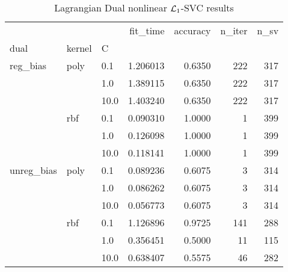 \begin{table}[H]
\centering
\caption{Lagrangian Dual nonlinear $\protect \mathcal{L}_1$-SVC results}
\label{nonlinear_lagrangian_dual_l1_svc_cv_results}
\begin{tabular}{lllrrrr}
\toprule
           &     &      &  fit\_time &  accuracy &  n\_iter &  n\_sv \\
dual & kernel & C &           &           &         &       \\
\midrule
reg\_bias & poly & 0.1  &  1.206013 &    0.6350 &     222 &   317 \\
           &     & 1.0  &  1.389115 &    0.6350 &     222 &   317 \\
           &     & 10.0 &  1.403240 &    0.6350 &     222 &   317 \\
           & rbf & 0.1  &  0.090310 &    1.0000 &       1 &   399 \\
           &     & 1.0  &  0.126098 &    1.0000 &       1 &   399 \\
           &     & 10.0 &  0.118141 &    1.0000 &       1 &   399 \\
unreg\_bias & poly & 0.1  &  0.089236 &    0.6075 &       3 &   314 \\
           &     & 1.0  &  0.086262 &    0.6075 &       3 &   314 \\
           &     & 10.0 &  0.056773 &    0.6075 &       3 &   314 \\
           & rbf & 0.1  &  1.126896 &    0.9725 &     141 &   288 \\
           &     & 1.0  &  0.356451 &    0.5000 &      11 &   115 \\
           &     & 10.0 &  0.638407 &    0.5575 &      46 &   282 \\
\bottomrule
\end{tabular}
\end{table}
